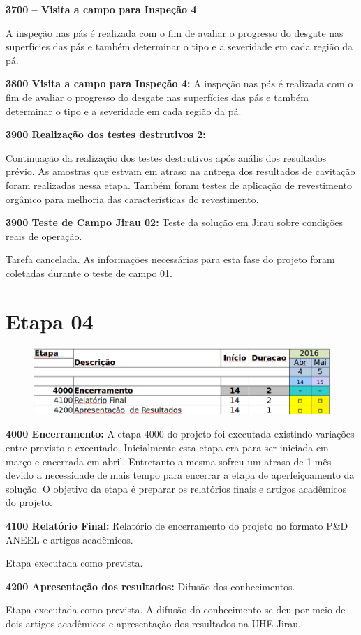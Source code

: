 


\noindent
\textbf{3700 – Visita a campo para Inspeção 4}

A inspeção nas pás é realizada com o fim de avaliar o progresso do desgate nas superfícies das
pás e também determinar o tipo e a severidade em cada região da pá.

\noindent
\textbf{3800  Visita a campo para Inspeção 4:}
A inspeção nas pás é realizada com o fim de avaliar o progresso do desgate nas
superfícies das pás e também determinar o tipo e a severidade em cada região da pá.

\noindent
\textbf{3900 Realização dos testes destrutivos 2:}

Continuação da realização dos testes destrutivos após anális dos resultados prévio. As amostras que estvam em atraso na antrega dos resultados de cavitação foram realizadas nessa etapa. Também foram testes de aplicação de revestimento orgânico para melhoria das características do revestimento.


\noindent
\textbf{3900 Teste de Campo Jirau 02:} Teste da solução  em Jirau sobre
condições reais de operação.

Tarefa cancelada. As informações necessárias para esta fase do
projeto foram coletadas durante o teste de campo 01. 

\section{Etapa 04} 

\begin{figure}[H]
\centering
\includegraphics[width=0.9\columnwidth]{figs/etapa4}
\end{figure} 

\noindent
\textbf{4000 Encerramento:} A etapa 4000 do projeto foi executada existindo
variações entre previsto e executado. Inicialmente esta etapa era para ser
iniciada em março e encerrada em abril. Entretanto a mesma sofreu um atraso de 1
mês devido a necessidade de mais tempo para encerrar a etapa de aperfeiçoamento
da solução. O objetivo da etapa é preparar os relatórios finais e artigos acadêmicos do projeto.

\noindent
\textbf{4100 Relatório Final:} Relatório de encerramento do projeto no formato
P\&D ANEEL e artigos acadêmicos.

Etapa executada como prevista. 

\noindent
\textbf{4200 Apresentação dos resultados:} Difusão dos conhecimentos.

Etapa executada como prevista. A difusão do conhecimento se deu por meio de dois
artigos acadêmicos e apresentação dos resultados na UHE Jirau.
